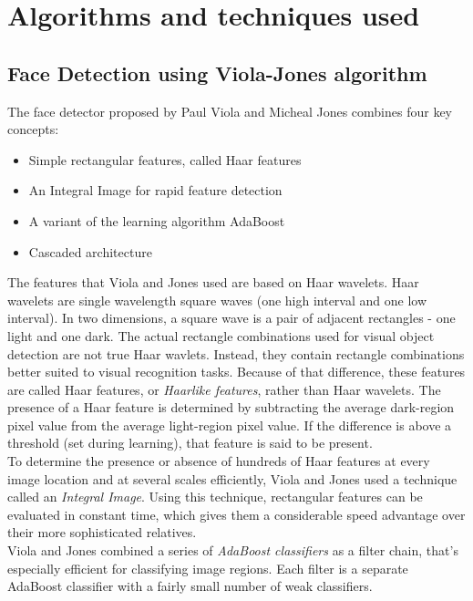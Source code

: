 \documentclass[%
        final,
        notitlepage,
        narroweqnarray,
        inline,
        ]{ieee}
\begin{document}
\section{Algorithms and techniques used} \label{sec:algo}

\subsection{Face Detection using Viola-Jones algorithm}
The face detector proposed by Paul Viola and Micheal Jones\cite{Viola01} combines four key concepts\cite{servo}:
\begin{itemize}
	\item Simple rectangular features, called Haar features
	\item An Integral Image for rapid feature detection
	\item A variant of the learning algorithm AdaBoost
	\item Cascaded architecture
\end{itemize}
The features that Viola and Jones used are based on Haar wavelets.
Haar wavelets are single wavelength square waves (one high interval and one low interval).
In two dimensions, a square wave is a pair of adjacent rectangles - one light and one dark.
The actual rectangle combinations used for visual object detection are not true Haar wavlets.
Instead, they contain rectangle combinations better suited to visual recognition tasks.
Because of that difference, these features are called Haar features, or \emph{Haarlike features}, rather than Haar wavelets.
The presence of a Haar feature is determined by subtracting the average dark-region pixel value from the average light-region pixel value.
If the difference is above a threshold (set during learning), that feature is said to be present.\\
To determine the presence or absence of hundreds of Haar features at every image location and at several scales efficiently, Viola and Jones used a technique called an \emph{Integral Image}.
Using this technique, rectangular features can be evaluated in constant time, which gives them a considerable speed advantage over their more sophisticated relatives.\\
Viola and Jones combined a series of \emph{AdaBoost classifiers} as a filter chain, that's especially efficient for classifying image regions.
Each filter is a separate AdaBoost classifier with a fairly small number of weak classifiers.
\end{document}
